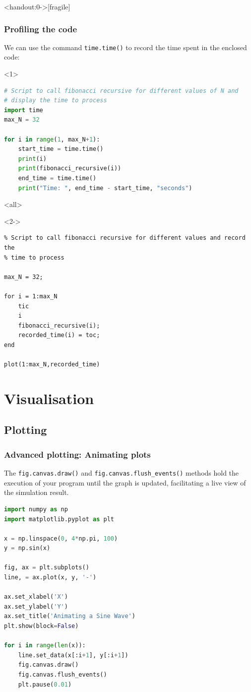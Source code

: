 \begin{frame}<handout:0->[fragile]
  \frametitle{Profiling the code}
  We can use the command \lstinline$time.time()$ to record the time spent in the enclosed code:
    \begin{onlyenv}<1>
      \lstset{showlines=true}
    \begin{lstlisting}[language=Python]
# Script to call fibonacci recursive for different values of N and 
# display the time to process
import time 
max_N = 32

for i in range(1, max_N+1):
    start_time = time.time()
    print(i)
    print(fibonacci_recursive(i))
    end_time = time.time()
    print("Time: ", end_time - start_time, "seconds")
\end{lstlisting}
  \end{onlyenv}
  \mode<all>
  \begin{onlyenv}<2->
    \begin{lstlisting}
% Script to call fibonacci recursive for different values and record the
% time to process

max_N = 32;

for i = 1:max_N
    tic
    i
    fibonacci_recursive(i);
    recorded_time(i) = toc;
end

plot(1:max_N,recorded_time)
        \end{lstlisting}
      \end{onlyenv}
\end{frame}

\section{Visualisation}
\subsection*{Plotting}
\begin{frame}[fragile]
  \frametitle{Advanced plotting: Animating plots}
  The \texttt{fig.canvas.draw()} and \texttt{fig.canvas.flush\_events()} methods hold the execution of your program until the graph is updated, facilitating a live view of the simulation result.
  \begin{lstlisting}[language=Python]
import numpy as np
import matplotlib.pyplot as plt

x = np.linspace(0, 4*np.pi, 100)
y = np.sin(x)

fig, ax = plt.subplots()
line, = ax.plot(x, y, '-')

ax.set_xlabel('X')
ax.set_ylabel('Y')
ax.set_title('Animating a Sine Wave')
plt.show(block=False)

for i in range(len(x)):
    line.set_data(x[:i+1], y[:i+1])
    fig.canvas.draw()
    fig.canvas.flush_events()
    plt.pause(0.01)
  \end{lstlisting}
\end{frame}



